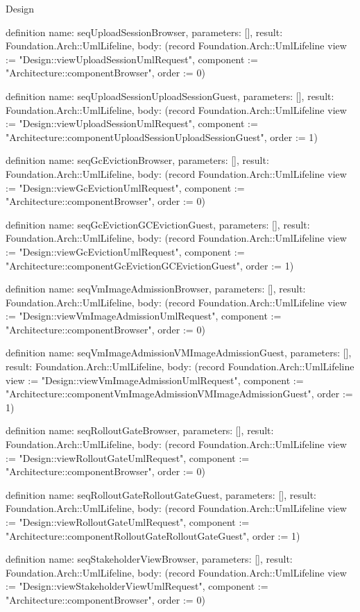 \begin{lexlean}{Design}
\begin{semanticmodule}
definition{
  name: seqUploadSessionBrowser,
  parameters: [],
  result: Foundation.Arch::UmlLifeline,
  body: (record Foundation.Arch::UmlLifeline {view := "Design::viewUploadSessionUmlRequest", component := "Architecture::componentBrowser", order := 0})
}

definition{
  name: seqUploadSessionUploadSessionGuest,
  parameters: [],
  result: Foundation.Arch::UmlLifeline,
  body: (record Foundation.Arch::UmlLifeline {view := "Design::viewUploadSessionUmlRequest", component := "Architecture::componentUploadSessionUploadSessionGuest", order := 1})
}

definition{
  name: seqGcEvictionBrowser,
  parameters: [],
  result: Foundation.Arch::UmlLifeline,
  body: (record Foundation.Arch::UmlLifeline {view := "Design::viewGcEvictionUmlRequest", component := "Architecture::componentBrowser", order := 0})
}

definition{
  name: seqGcEvictionGCEvictionGuest,
  parameters: [],
  result: Foundation.Arch::UmlLifeline,
  body: (record Foundation.Arch::UmlLifeline {view := "Design::viewGcEvictionUmlRequest", component := "Architecture::componentGcEvictionGCEvictionGuest", order := 1})
}

definition{
  name: seqVmImageAdmissionBrowser,
  parameters: [],
  result: Foundation.Arch::UmlLifeline,
  body: (record Foundation.Arch::UmlLifeline {view := "Design::viewVmImageAdmissionUmlRequest", component := "Architecture::componentBrowser", order := 0})
}

definition{
  name: seqVmImageAdmissionVMImageAdmissionGuest,
  parameters: [],
  result: Foundation.Arch::UmlLifeline,
  body: (record Foundation.Arch::UmlLifeline {view := "Design::viewVmImageAdmissionUmlRequest", component := "Architecture::componentVmImageAdmissionVMImageAdmissionGuest", order := 1})
}

definition{
  name: seqRolloutGateBrowser,
  parameters: [],
  result: Foundation.Arch::UmlLifeline,
  body: (record Foundation.Arch::UmlLifeline {view := "Design::viewRolloutGateUmlRequest", component := "Architecture::componentBrowser", order := 0})
}

definition{
  name: seqRolloutGateRolloutGateGuest,
  parameters: [],
  result: Foundation.Arch::UmlLifeline,
  body: (record Foundation.Arch::UmlLifeline {view := "Design::viewRolloutGateUmlRequest", component := "Architecture::componentRolloutGateRolloutGateGuest", order := 1})
}

definition{
  name: seqStakeholderViewBrowser,
  parameters: [],
  result: Foundation.Arch::UmlLifeline,
  body: (record Foundation.Arch::UmlLifeline {view := "Design::viewStakeholderViewUmlRequest", component := "Architecture::componentBrowser", order := 0})
}


\end{semanticmodule}
\end{lexlean}
